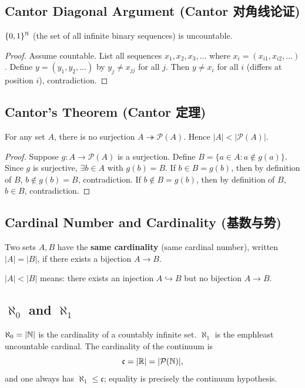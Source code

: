 \documentclass{article}
\begin{document}
\subsection{Cantor Diagonal Argument (Cantor 对角线论证)}\label{def:cantor-diag}
\begin{theorem}
  $\{0, 1\}^{\mathbb{N}}$ (the set of all infinite binary sequences) is uncountable.
\end{theorem}
\begin{proof}
  Assume countable. List all sequences $x_1, x_2, x_3, \ldots$ where
  $x_i = (x_{i1}, x_{i2}, \ldots)$.
  Define $y = (y_1, y_2, \ldots)$ by $y_j \neq x_{jj}$ for all $j$.
  Then $y \neq x_i$ for all $i$ (differs at position $i$), contradiction.
\end{proof}

\subsection{Cantor's Theorem (Cantor 定理)}\label{def:cantor-thm}
\begin{theorem}
  For any set $A$, there is no surjection $A \twoheadrightarrow
  \mathcal{P}(A)$. Hence $|A| < |\mathcal{P}(A)|$.
\end{theorem}
\begin{proof}
  Suppose $g : A \to \mathcal{P}(A)$ is a surjection. Define $B = \{a
  \in A : a \notin g(a)\}$.
  Since $g$ is surjective, $\exists b \in A$ with $g(b) = B$.
  If $b \in B = g(b)$, then by definition of $B$, $b \notin g(b) =
  B$, contradiction.
  If $b \notin B = g(b)$, then by definition of $B$, $b \in B$, contradiction.
\end{proof}

\subsection{Cardinal Number and Cardinality (基数与势)}\label{def:cardinality}
Two sets $A, B$ have the \textbf{same cardinality} (same cardinal
number), written $|A| = |B|$, if there exists a bijection $A \to B$.

$|A| < |B|$ means: there exists an injection $A \hookrightarrow B$
but no bijection $A \to B$.

\subsection{$\aleph_0$ and $\aleph_1$}\label{def:aleph}
$\aleph_0 = |\mathbb{N}|$ is the cardinality of a countably infinite set.
$\aleph_1$ is the emph{least uncountable} cardinal.  The cardinality of
the continuum is
\[
  \mathfrak{c}=|\mathbb{R}|=|\mathcal{P}(\mathbb{N})|,
\]
and one always has $\aleph_1\leq\mathfrak{c}$; equality is precisely the
continuum hypothesis.
\end{document}
